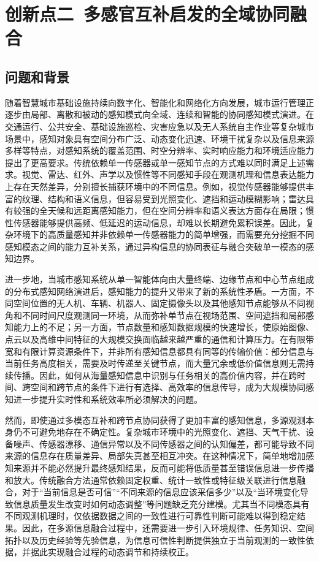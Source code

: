 \newpage
\section{创新点二\ 多感官互补启发的全域协同融合}
\subsection{问题和背景}
随着智慧城市基础设施持续向数字化、智能化和网络化方向发展，城市运行管理正逐步由局部、离散和被动的感知模式向全域、连续和智能的协同感知模式演进。在交通运行、公共安全、基础设施巡检、灾害应急以及无人系统自主作业等复杂城市场景中，感知对象具有空间分布广泛、动态变化迅速、环境干扰复杂以及信息来源多样等特点，对感知系统的覆盖范围、时空分辨率、实时响应能力和环境适应能力提出了更高要求。传统依赖单一传感器或单一感知节点的方式难以同时满足上述需求。视觉、雷达、红外、声学以及惯性等不同感知手段在观测机理和信息表达能力上存在天然差异，分别擅长捕获环境中的不同信息。例如，视觉传感器能够提供丰富的纹理、结构和语义信息，但容易受到光照变化、遮挡和运动模糊影响；雷达具有较强的全天候和远距离感知能力，但在空间分辨率和语义表达方面存在局限；惯性传感器能够提供高频、低延迟的运动信息，却难以长期避免累积误差。因此，复杂环境下的高质量感知并非依赖单一传感器能力的简单增强，而需要充分挖掘不同感知模态之间的能力互补关系，通过异构信息的协同表征与融合突破单一模态的感知边界。

进一步地，当城市感知系统从单一智能体向由大量终端、边缘节点和中心节点组成的分布式感知网络演进后，感知能力的提升又带来了新的系统性矛盾。一方面，不同空间位置的无人机、车辆、机器人、固定摄像头以及其他感知节点能够从不同视角和不同时间尺度观测同一环境，从而弥补单节点在视场范围、空间遮挡和局部感知能力上的不足；另一方面，节点数量和感知数据规模的快速增长，使原始图像、点云以及高维中间特征的大规模交换面临越来越严重的通信和计算压力。在有限带宽和有限计算资源条件下，并非所有感知信息都具有同等的传输价值：部分信息与当前任务高度相关，需要及时传递至关键节点，而大量冗余或低价值信息则无需持续传播。因此，如何从海量感知信息中识别与任务相关的高价值内容，并在跨时间、跨空间和跨节点的条件下进行有选择、高效率的信息传导，成为大规模协同感知进一步提升实时性和系统效率所必须解决的问题。

然而，即使通过多模态互补和跨节点协同获得了更加丰富的感知信息，多源观测本身仍不可避免地存在不确定性。复杂城市环境中的光照变化、遮挡、天气干扰、设备噪声、传感器漂移、通信异常以及不同传感器之间的认知偏差，都可能导致不同来源的信息存在质量差异、局部失真甚至相互冲突。在这种情况下，简单地增加感知来源并不能必然提升最终感知结果，反而可能将低质量甚至错误信息进一步传播和放大。传统融合方法通常依赖固定权重、统计一致性或特征级关联进行信息融合，对于“当前信息是否可信”“不同来源的信息应该采信多少”以及“当环境变化导致信息质量发生改变时如何动态调整”等问题缺乏充分建模。尤其当不同模态具有不同观测机理时，仅依据数据之间的一致性进行可靠性判断可能难以得到稳定结果。因此，在多源信息融合过程中，还需要进一步引入环境规律、任务知识、空间拓扑以及历史经验等先验信息，为信息可信性判断提供独立于当前观测的一致性依据，并据此实现融合过程的动态调节和持续校正。

